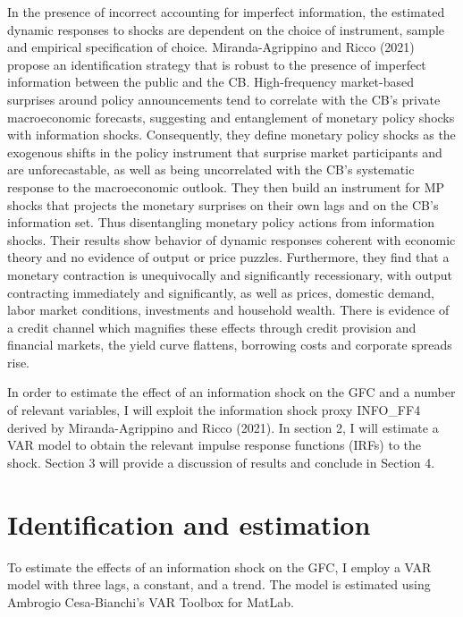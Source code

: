 \documentclass[11pt,a4paper]{article}
\begin{document}
In the presence of incorrect accounting for imperfect information, the estimated dynamic responses to shocks are dependent on the choice of instrument, sample and empirical specification of choice. Miranda-Agrippino and Ricco (2021) propose an identification strategy that is robust to the presence of imperfect information between the public and the CB.
High-frequency market-based surprises around policy announcements tend to correlate with the CB's private macroeconomic forecasts, suggesting and entanglement of monetary policy shocks with information shocks. Consequently, they define  monetary policy shocks as the exogenous shifts in the policy instrument that surprise market participants and are unforecastable, as well as being uncorrelated with the CB's systematic response to the macroeconomic outlook. They then build an instrument for MP shocks that projects the monetary surprises on their own lags and on the CB's information set. Thus disentangling monetary policy actions from information shocks. 
Their results show behavior of dynamic responses coherent with economic theory and no evidence of output or price puzzles. Furthermore, they find that a monetary contraction is unequivocally and significantly recessionary, with output contracting immediately and significantly, as well as prices, domestic demand, labor market conditions, investments and household wealth. There is evidence of a credit channel which magnifies these effects through credit provision and financial markets, the yield curve flattens, borrowing costs and corporate spreads rise.


In order to estimate the effect of an information shock on the GFC and a number of relevant variables, I will exploit the information shock proxy INFO\_FF4 derived by Miranda-Agrippino and Ricco (2021).
In section 2, I will estimate a VAR model to obtain the relevant impulse response functions (IRFs) to the shock.
Section 3 will provide a discussion of results and conclude in Section 4.



\section{Identification and estimation}
To estimate the effects of an information shock on the GFC, I employ a VAR model with three lags, a constant, and a trend. The model is estimated using Ambrogio Cesa-Bianchi's VAR Toolbox for MatLab.
\end{document}
